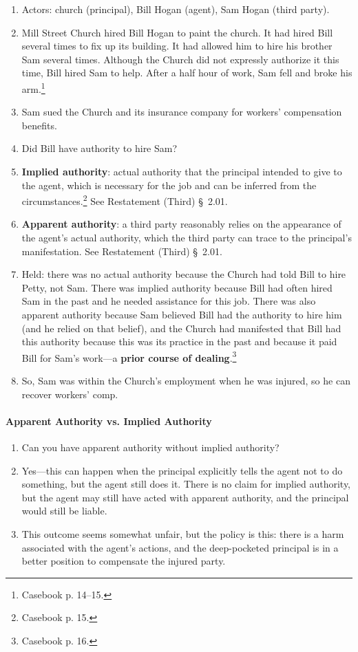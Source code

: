 \begin{enumerate}
    \item Actors: church (principal), Bill Hogan (agent), Sam Hogan (third 
    party).
    \item Mill Street Church hired Bill Hogan to paint the church. It had 
    hired Bill several times to fix up its building. It had allowed him to 
    hire his brother Sam several times.  Although the Church did not expressly 
    authorize it this time, Bill hired Sam to help. After a half hour of work, 
    Sam fell and broke his arm.\footnote{Casebook p. 14--15.}
    \item Sam sued the Church and its insurance company for workers' 
    compensation benefits.
    \item Did Bill have authority to hire Sam?
    \item \textbf{Implied authority}: actual authority that the principal 
    intended to give to the agent, which is necessary for the job and can be 
    inferred from the circumstances.\footnote{Casebook p. 15.} See 
    Restatement (Third) \S\ 2.01.
    \item \textbf{Apparent authority}: a third party reasonably relies on the 
    appearance of the agent's actual authority, which the third party can 
    trace to the principal's manifestation. See Restatement (Third) \S\ 2.01.
    \item Held: there was no actual authority because the Church had told Bill 
    to hire Petty, not Sam. There was implied authority because Bill had often 
    hired Sam in the past and he needed assistance for this job. There was 
    also apparent authority because Sam believed Bill had the authority to 
    hire him (and he relied on that belief), and the Church had manifested 
    that Bill had this authority because this was its practice in the past and 
    because it paid Bill for Sam's work---a \textbf{prior course of 
    dealing}.\footnote{Casebook p. 16.}
    \item So, Sam was within the Church's employment when he was injured, so 
    he can recover workers' comp.
\end{enumerate}

\paragraph{Apparent Authority vs. Implied Authority}

\begin{enumerate}
    \item Can you have apparent authority without implied authority?
    \item Yes---this can happen when the principal explicitly tells the agent 
    not to do something, but the agent still does it. There is no claim for 
    implied authority, but the agent may still have acted with apparent 
    authority, and the principal would still be liable.
    \item This outcome seems somewhat unfair, but the policy is this: there is 
    a harm associated with the agent's actions, and the deep-pocketed 
    principal is in a better position to compensate the injured party.
\end{enumerate}

